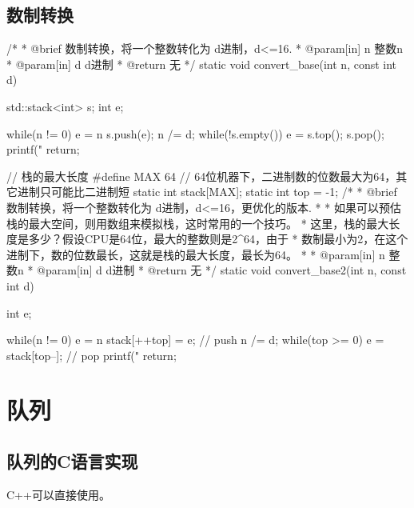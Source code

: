 \subsection{数制转换}
\begin{Codex}[label=convert_base.cpp]
 /*
  * @brief 数制转换，将一个整数转化为 d进制，d<=16.
  * @param[in] n 整数n
  * @param[in] d d进制
  * @return 无
  */
static void convert_base(int n, const int d)
{
	std::stack<int> s;
	int e;

	while(n != 0) {
		e = n %
		s.push(e);
		n /= d;
	}
	while(!s.empty()) {
		e = s.top();
		s.pop();
		printf("%
	}
	return;
}

// 栈的最大长度
#define MAX 64 // 64位机器下，二进制数的位数最大为64，其它进制只可能比二进制短
static int stack[MAX];
static int top = -1;
 /*
  * @brief 数制转换，将一个整数转化为 d进制，d<=16，更优化的版本.
  *
  * 如果可以预估栈的最大空间，则用数组来模拟栈，这时常用的一个技巧。
  * 这里，栈的最大长度是多少？假设CPU是64位，最大的整数则是2^64，由于
  * 数制最小为2，在这个进制下，数的位数最长，这就是栈的最大长度，最长为64。
  *
  * @param[in] n 整数n
  * @param[in] d d进制
  * @return 无
  */
static void convert_base2(int n, const int d)
{
	int e;

	while(n != 0) {
		e = n %
		stack[++top] = e; // push
		n /= d;
	}
	while(top >= 0) {
		e = stack[top--]; // pop
		printf("%
	}
	return;
}
\end{Codex}

\section{队列} %

\subsection{队列的C语言实现}
C++可以直接使用。

